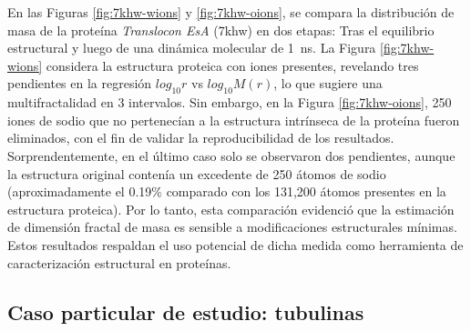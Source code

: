 	En las Figuras \ref{fig:7khw-wions} y \ref{fig:7khw-oions}, se compara la distribuci\'{o}n de masa de la prote\'{i}na \textit{Translocon EsA} (7khw) en dos etapas: Tras el equilibrio estructural y luego de una din\'{a}mica molecular de 1~ns. La Figura \ref{fig:7khw-wions} considera la estructura proteica con iones presentes, revelando tres pendientes en la regresi\'{o}n $log_{10}r$ vs $log_{10}M(r)$, lo que sugiere una multifractalidad en 3 intervalos. Sin embargo, en la Figura \ref{fig:7khw-oions}, 250 iones de sodio que no pertenec\'{i}an a la estructura intr\'{i}nseca de la prote\'{i}na fueron eliminados, con el fin de validar la reproducibilidad de los resultados. Sorprendentemente, en el \'{u}ltimo caso solo se observaron dos pendientes, aunque la estructura original conten\'{i}a  un excedente de 250 \'{a}tomos de sodio (aproximadamente el 0.19\% comparado con los 131,200 átomos presentes en la estructura proteica). Por lo tanto, esta comparaci\'{o}n evidenci\'{o} que la estimaci\'{o}n de dimensi\'{o}n fractal de masa es sensible a modificaciones estructurales m\'{i}nimas. Estos resultados respaldan el uso potencial de dicha medida como herramienta de caracterizaci\'{o}n estructural en prote\'{i}nas. 
	
	
	\subsection*{Caso particular de estudio: tubulinas}
	
